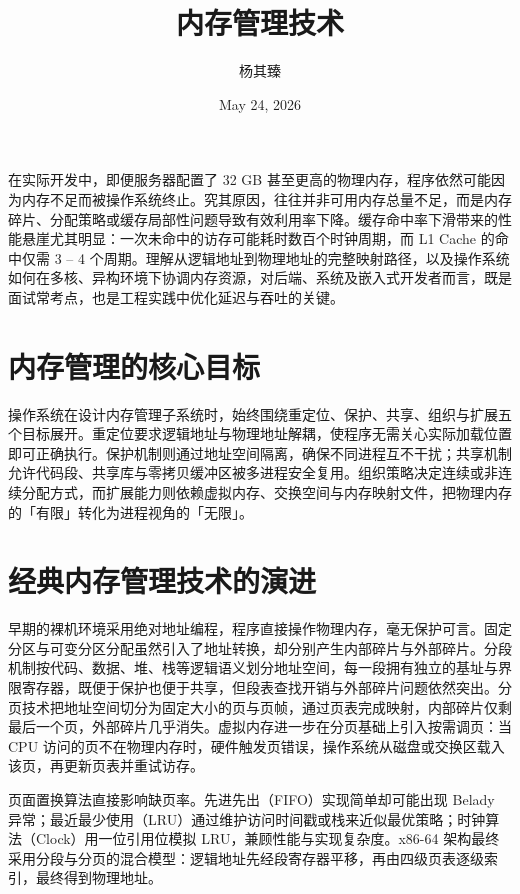 \title{内存管理技术}
\author{杨其臻}
\date{May 24, 2026}
\maketitle
在实际开发中，即便服务器配置了 32 GB 甚至更高的物理内存，程序依然可能因为内存不足而被操作系统终止。究其原因，往往并非可用内存总量不足，而是内存碎片、分配策略或缓存局部性问题导致有效利用率下降。缓存命中率下滑带来的性能悬崖尤其明显：一次未命中的访存可能耗时数百个时钟周期，而 L1 Cache 的命中仅需 3 – 4 个周期。理解从逻辑地址到物理地址的完整映射路径，以及操作系统如何在多核、异构环境下协调内存资源，对后端、系统及嵌入式开发者而言，既是面试常考点，也是工程实践中优化延迟与吞吐的关键。\par
\chapter{内存管理的核心目标}
操作系统在设计内存管理子系统时，始终围绕重定位、保护、共享、组织与扩展五个目标展开。重定位要求逻辑地址与物理地址解耦，使程序无需关心实际加载位置即可正确执行。保护机制则通过地址空间隔离，确保不同进程互不干扰；共享机制允许代码段、共享库与零拷贝缓冲区被多进程安全复用。组织策略决定连续或非连续分配方式，而扩展能力则依赖虚拟内存、交换空间与内存映射文件，把物理内存的「有限」转化为进程视角的「无限」。\par
\chapter{经典内存管理技术的演进}
早期的裸机环境采用绝对地址编程，程序直接操作物理内存，毫无保护可言。固定分区与可变分区分配虽然引入了地址转换，却分别产生内部碎片与外部碎片。分段机制按代码、数据、堆、栈等逻辑语义划分地址空间，每一段拥有独立的基址与界限寄存器，既便于保护也便于共享，但段表查找开销与外部碎片问题依然突出。分页技术把地址空间切分为固定大小的页与页帧，通过页表完成映射，内部碎片仅剩最后一个页，外部碎片几乎消失。虚拟内存进一步在分页基础上引入按需调页：当 CPU 访问的页不在物理内存时，硬件触发页错误，操作系统从磁盘或交换区载入该页，再更新页表并重试访存。\par
页面置换算法直接影响缺页率。先进先出（FIFO）实现简单却可能出现 Belady 异常；最近最少使用（LRU）通过维护访问时间戳或栈来近似最优策略；时钟算法（Clock）用一位引用位模拟 LRU，兼顾性能与实现复杂度。x86-64 架构最终采用分段与分页的混合模型：逻辑地址先经段寄存器平移，再由四级页表逐级索引，最终得到物理地址。\par
